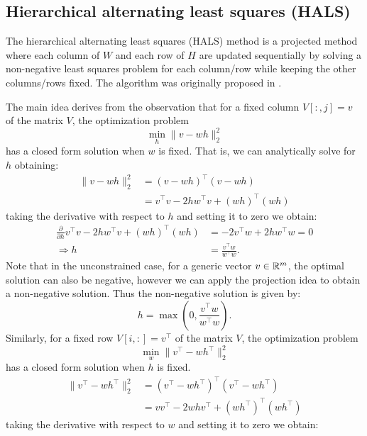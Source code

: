 \subsection{Hierarchical alternating least squares (HALS)}
The hierarchical alternating least squares (HALS) method is a projected method where each column of \( W \) and each row of \( H \) are updated sequentially by solving a non-negative least squares problem for each column/row while keeping the other columns/rows fixed.
The algorithm was originally proposed in \cite{cichocki2007hierarchical}.
\par
The main idea derives from the observation that for a fixed column $V[:,j] = v$ of the matrix \( V \), the optimization problem
\begin{equation}
    \min_{h} \| v - wh \|_2^2
\end{equation}
has a closed form solution when $w$ is fixed.
That is, we can analytically solve for $h$ obtaining:
\begin{align}
    \| v - wh \|_2^2 &= (v - wh)^\top (v - wh) \\
    &= v^\top v - 2h w^\top v + (wh)^\top (wh) 
\end{align}
taking the derivative with respect to $h$ and setting it to zero we obtain:
\begin{align}
    \frac{\partial}{\partial h} v^\top v - 2h w^\top v + (wh)^\top (wh) &= -2v^\top w + 2h w^\top w = 0 \\
    \Rightarrow h &= \frac{v^\top w}{w^\top w}.
\end{align}
Note that in the unconstrained case, for a generic vector $v \in \mathbb{R}^m$, the optimal solution can also be negative, however we can apply the projection idea to obtain a non-negative solution.
Thus the non-negative solution is given by:
\begin{equation}
    h = \max\left(0, \frac{v^\top w}{w^\top w} \right).
\end{equation}
Similarly, for a fixed row $V[i,:] = v^\top$ of the matrix \( V \), the optimization problem
\begin{equation}
    \min_{w} \| v^\top - w h^\top \|_2^2
\end{equation}
has a closed form solution when $h$ is fixed.
\begin{align}
    \| v^\top - w h^\top \|_2^2 &= (v^\top - w h^\top)^\top (v^\top - w h^\top) \\
    &= v v^\top - 2w h v^\top + (w h^\top)^\top (w h^\top) 
\end{align}
taking the derivative with respect to $w$ and setting it to zero we obtain:
